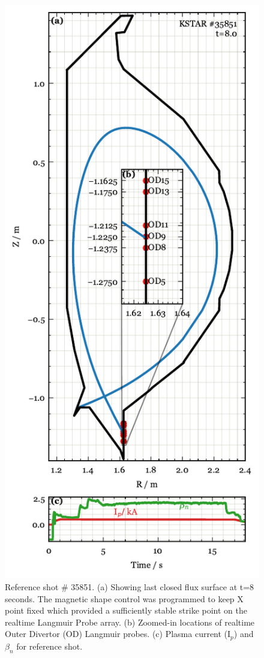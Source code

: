 \begin{figure}[!ht]
 \centering
 \includegraphics[width=\linewidth]{figures/RefShot.pdf}
 \caption{
Reference shot \# 35851.
(a) Showing last closed flux surface at t=8 seconds.
The magnetic shape control was programmed to keep X point fixed which provided a sufficiently stable strike point on the realtime Langmuir Probe array.
(b) Zoomed-in locations of realtime Outer Divertor (OD) Langmuir probes.
(c) Plasma current (I$_p$) and $\beta_n$ for reference shot.
}
 \label{fig:ref_shot}
\end{figure}